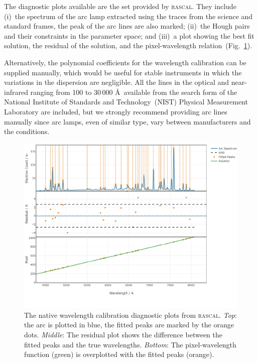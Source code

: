 \documentclass[linenumbers, twocolumn]{aastex631}
\begin{document}
The diagnostic plots available are the set provided by \textsc{rascal}.
They include (i)~the spectrum of the arc lamp extracted using the traces from
the science and standard frames, the peak of the arc lines are also marked;
(ii)~the Hough pairs and their constraints in the parameter space;
and (iii)~a plot showing the best fit solution, the residual of the solution,
and the pixel-wavelength relation~(Fig.~\ref{fig:wavecal}).

Alternatively, the polynomial coefficients for the wavelength calibration can be
supplied manually, which would be useful for stable instruments in which the
variations in the dispersion are negligible. All the lines in the optical and
near-infrared ranging from 100 to 30\,000 \AA\ 
available from the search form of the National Institute of Standards and
Technology~(NIST) Physical Measurement Laboratory are included, but we strongly
recommend providing arc lines manually since arc lamps, even of similar type,
vary between manufacturers and the conditions.

\begin{figure}
    \centering
    \includegraphics[width=\columnwidth]{fig_05_wavelength_calibration_diagnostics.pdf}
    \caption{The native wavelength calibration diagnostic plots from \textsc{rascal}.
    \textit{Top}: the arc is plotted in blue, the fitted peaks are marked by
    the orange dots. \textit{Middle}: The residual plot shows the difference
    between the fitted peaks and the true wavelengths. \textit{Bottom}: The
    pixel-wavelength function (green) is overplotted with the fitted
    peaks (orange).}
    \label{fig:wavecal}
\end{figure}
\end{document}
